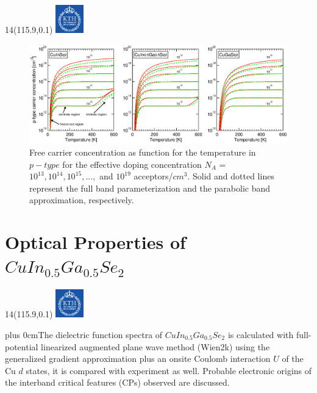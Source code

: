 \documentclass[]{beamer}
\newcommand{\MyLogo}{%
\begin{textblock}{14}(115.9,0.1)
  \includegraphics[width=1.22cm]{kth_rgb}
 \end{textblock}
}
\renewcommand{\raggedright}{\leftskip=0pt \rightskip=0pt plus 0cm}
\begin{document}
\begin{frame}
\MyLogo
\begin{figure}[H]
    \begin{center}
            \includegraphics[width=1\textwidth,clip]{seminar/p_type_carrier_concentrication}
     \end{center}
    \caption{Free carrier concentration as function for the temperature in $p-type$ for the effective doping concentration $N_A$ = $10^{13}, 10^{14}, 10^{15}, ... , $ and $10^{19}$ acceptors/$cm^3$. Solid and dotted lines represent the full band parameterization and the parabolic band approximation, respectively.}
\end{figure}
\end{frame}


\section{Optical Properties of   $ {CuIn_{0.5}Ga_{0.5}Se_2} $}
\begin{frame}
\MyLogo

\raggedright {The dielectric function spectra of $CuIn_{0.5}Ga_{0.5}Se_{2}$ is calculated with full-potential linearized augmented plane wave method (Wien2k) using the generalized gradient approximation plus an onsite Coulomb interaction $U$ of the Cu $d$ states, it is compared with experiment as well. Probable electronic origins of the interband critical features (CPs) observed are discussed.}

\end{frame}
\end{document}
